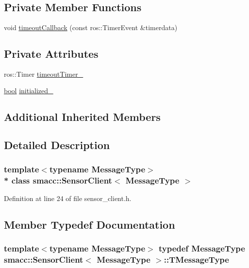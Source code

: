 \subsection*{Private Member Functions}
\begin{DoxyCompactItemize}
\item 
void \hyperlink{classsmacc_1_1SensorClient_adea5a6e03330691fd0bd30acf1594011}{timeout\+Callback} (const ros\+::\+Timer\+Event \&timerdata)
\end{DoxyCompactItemize}
\subsection*{Private Attributes}
\begin{DoxyCompactItemize}
\item 
ros\+::\+Timer \hyperlink{classsmacc_1_1SensorClient_a5a82e2fa1f0ccfe2564125fae2f9783a}{timeout\+Timer\+\_\+}
\item 
\hyperlink{classbool}{bool} \hyperlink{classsmacc_1_1SensorClient_a7dde11291a16f6c2edaa02552895ee9e}{initialized\+\_\+}
\end{DoxyCompactItemize}
\subsection*{Additional Inherited Members}


\subsection{Detailed Description}
\subsubsection*{template$<$typename Message\+Type$>$\\*
class smacc\+::\+Sensor\+Client$<$ Message\+Type $>$}



Definition at line 24 of file sensor\+\_\+client.\+h.



\subsection{Member Typedef Documentation}
\subsubsection[{\texorpdfstring{T\+Message\+Type}{TMessageType}}]{\setlength{\rightskip}{0pt plus 5cm}template$<$typename Message\+Type$>$ typedef Message\+Type {\bf smacc\+::\+Sensor\+Client}$<$ Message\+Type $>$\+::{\bf T\+Message\+Type}}\hypertarget{classsmacc_1_1SensorClient_a5a35234e021e849d213a3dae58094ac5}{}\label{classsmacc_1_1SensorClient_a5a35234e021e849d213a3dae58094ac5}


